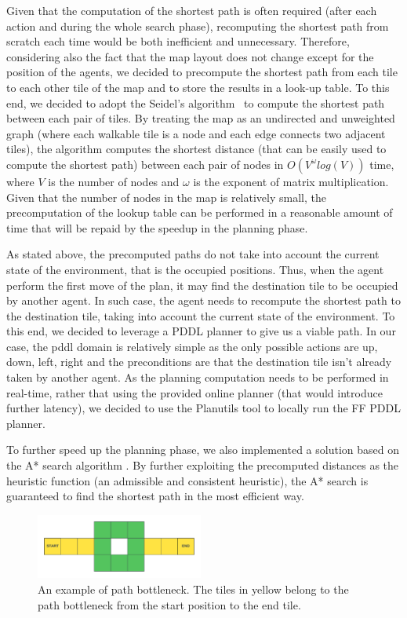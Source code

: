 Given that the computation of the shortest path is often required (after each action and during the whole search phase), recomputing the shortest path from scratch each time would be both inefficient and unnecessary. Therefore, considering also the fact that the map layout does not change except for the position of the agents, we decided to precompute the shortest path from each tile to each other tile of the map and to store the results in a look-up table. To this end, we decided to adopt the Seidel's algorithm~\parencite{seidel} to compute the shortest path between each pair of tiles. By treating the map as an undirected and unweighted graph (where each walkable tile is a node and each edge connects two adjacent tiles), the algorithm computes the shortest distance (that can be easily used to compute the shortest path) between each pair of nodes in $O(V^{\omega} log(V))$ time, where $V$ is the number of nodes and $\omega$ is the exponent of matrix multiplication. Given that the number of nodes in the map is relatively small, the precomputation of the lookup table can be performed in a reasonable amount of time that will be repaid by the speedup in the planning phase.

As stated above, the precomputed paths do not take into account the current state of the environment, that is the occupied positions. Thus, when the agent perform the first move of the plan, it may find the destination tile to be occupied by another agent. In such case, the agent needs to recompute the shortest path to the destination tile, taking into account the current state of the environment. To this end, we decided to leverage a PDDL planner to give us a viable path. In our case, the pddl domain is relatively simple as the only possible actions are up, down, left, right and the preconditions are that the destination tile isn't already taken by another agent. As the planning computation needs to be performed in real-time, rather that using the provided online planner (that would introduce further latency), we decided to use the Planutils tool \parencite{planutils} to locally run the FF PDDL planner.

To further speed up the planning phase, we also implemented a  solution based on the A* search algorithm \parencite{a*}. By further exploiting the precomputed distances as the heuristic function (an admissible and consistent heuristic), the A* search is guaranteed to find the shortest path in the most efficient way.

\begin{figure}
    \centering
    \includegraphics[width=0.49\textwidth]{sections/figures/path-bottleneck.png}
    \caption{An example of path bottleneck. The tiles in yellow belong to the path bottleneck from the start position to the end tile.}
    \label{fig:path-bottleneck}
\end{figure}

